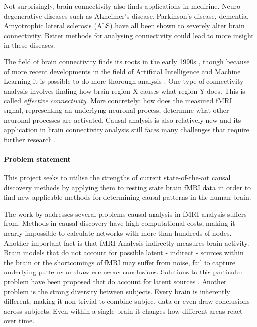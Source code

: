 \documentclass[a4paper, 10pt, english, twocolumn]{article}
\begin{document}
Not surprisingly, brain connectivity also finds applications in medicine.
Neuro-degenerative diseases such as Alzheimer's disease, Parkinson's disease, dementia, Amyotrophic lateral sclerosis (ALS) have all been shown to severely alter brain connectivity. %
Better methods for analysing connectivity could lead to more insight in these diseases.

The field of brain connectivity finds its roots in the early 1990s \cite{friston1993functional, friston1994}, though because of more recent developments in the field of Artificial Intelligence and Machine Learning it is possible to do more thorough analysis \cite{vandenheuvel2010}.
One type of connectivity analysis involves finding how brain region X causes what region Y does. This is called \emph{effective connectivity}.
More concretely: how does the measured fMRI signal, representing an underlying neuronal process, determine what other neuronal processes are activated.
Causal analysis is also relatively new and its application in brain connectivity analysis still faces many challenges that require further research \cite{ramsey2010}.

\paragraph{Problem statement}
This project seeks to utilise the strengths of current state-of-the-art causal discovery methods by applying them to resting state brain fMRI data in order to find new applicable methods for determining causal patterns in the human brain.

The work by \cite{ramsey2010} addresses several problems causal analysis in fMRI analysis suffers from.
Methods in causal discovery have high computational costs, making it nearly impossible to calculate networks with more than hundreds of nodes.
Another important fact is that fMRI Analysis indirectly measures brain activity.
Brain models that do not account for possible latent - indirect - sources within the brain or the shortcomings of fMRI may suffer from noise, fail to capture underlying patterns or draw erroneous conclusions.
Solutions to this particular problem have been proposed that do account for latent sources \cite{ramsey2010, waldorp2011}.
Another problem is the strong diversity between subjects.
Every brain is inherently different, making it non-trivial to combine subject data or even draw conclusions across subjects.
Even within a single brain it changes how different areas react over time.
\end{document}
